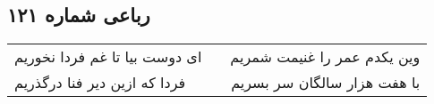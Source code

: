 \begin{center}
\section*{رباعی شماره ۱۲۱}
\label{sec:sh121}
\begin{longtable}{l p{0.5cm} r}
ای دوست بیا تا غم فردا نخوریم
&&
وین یکدم عمر را غنیمت شمریم
\\
فردا که ازین دیر فنا درگذریم
&&
با هفت هزار سالگان سر بسریم
\\
\end{longtable}
\end{center}
